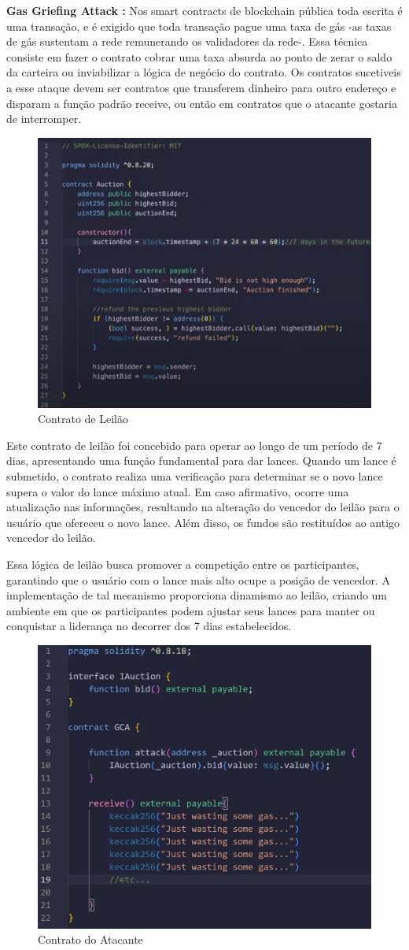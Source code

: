\textbf{Gas Griefing Attack \cite{GGA}:} Nos smart contracts de blockchain pública toda escrita é uma transação, e é exigido que toda transação pague uma taxa de gás -as taxas de gás sustentam a rede remunerando os validadores da rede-. 
Essa técnica consiste em fazer o contrato cobrar uma  taxa absurda ao ponto de zerar o saldo da carteira ou inviabilizar a lógica de negócio do contrato. 
Os contratos sucetiveis a esse ataque devem ser contratos que transferem dinheiro para outro endereço e disparam a função padrão receive, ou então em contratos que o atacante gostaria de interromper.
\begin{figure}
    \centering
    \includegraphics[width=0.5\linewidth]{figuras/Auction.png}
    \caption{Contrato de Leilão}
    \label{fig:enter-label}
\end{figure}

Este contrato de leilão foi concebido para operar ao longo de um período de 7 dias, apresentando uma função fundamental para dar lances. Quando um lance é submetido, o contrato realiza uma verificação para determinar se o novo lance supera o valor do lance máximo atual. Em caso afirmativo, ocorre uma atualização nas informações, resultando na alteração do vencedor do leilão para o usuário que ofereceu o novo lance. Além disso, os fundos são restituídos ao antigo vencedor do leilão.

Essa lógica de leilão busca promover a competição entre os participantes, garantindo que o usuário com o lance mais alto ocupe a posição de vencedor. A implementação de tal mecanismo proporciona dinamismo ao leilão, criando um ambiente em que os participantes podem ajustar seus lances para manter ou conquistar a liderança no decorrer dos 7 dias estabelecidos.

 \begin{figure}
    \centering
    \includegraphics[width=0.5\linewidth]{figuras/GGA.png}
    \caption{Contrato do Atacante}
    \label{fig:enter-label}
\end{figure}


